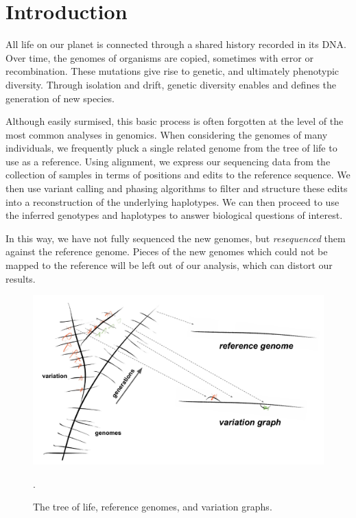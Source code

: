 
\chapter{Introduction}

\ifpdf
    \graphicspath{{Chapter1/Figs/Raster/}{Chapter1/Figs/PDF/}{Chapter1/Figs/}}
\else
    \graphicspath{{Chapter1/Figs/Vector/}{Chapter1/Figs/}}
\fi


All life on our planet is connected through a shared history recorded in its DNA.
Over time, the genomes of organisms are copied, sometimes with error or recombination.
These mutations give rise to genetic, and ultimately phenotypic diversity.
Through isolation and drift, genetic diversity enables and defines the generation of new species.

Although easily surmised, this basic process is often forgotten at the level of the most common analyses in genomics.
When considering the genomes of many individuals, we frequently pluck a single related genome from the tree of life to use as a reference.
Using alignment, we express our sequencing data from the collection of samples in terms of positions and edits to the reference sequence.
We then use variant calling and phasing algorithms to filter and structure these edits into a reconstruction of the underlying haplotypes.
We can then proceed to use the inferred genotypes and haplotypes to answer biological questions of interest.

In this way, we have not fully sequenced the new genomes, but \emph{resequenced} them against the reference genome.
Pieces of the new genomes which could not be mapped to the reference will be left out of our analysis, which can distort our results.

\begin{figure}[htbp!]
  \centering
  \includegraphics[width=1.0\textwidth]{Chapter1/Figs/phylogeny_and_vg.pdf}
  \caption{
    The tree of life, reference genomes, and variation graphs.
    } 
\label{fig:pangenomic_processes}.
\end{figure}

